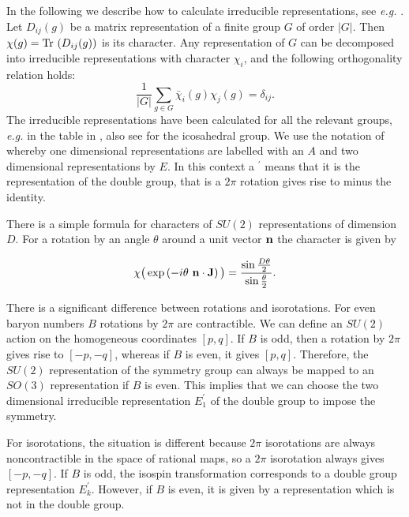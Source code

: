 \documentclass[a4paper,12pt]{article}
\begin{document}
In the following we describe how to calculate irreducible 
representations, see {\it e.g.} \cite{Hamermesh:1962}.
Let $D_{ij}(g)$  be a matrix representation of a finite group $G$ of order 
$|G|$. Then $\chi(g) = {\rm Tr}~ (D_{ij}(g))$ is its character. Any 
representation of $G$ can be decomposed into irreducible representations 
with character $\chi_i$, and the following orthogonality relation holds:
%
\begin{equation}
\frac{1}{|G|} \sum\limits_{g \in G} {\bar \chi}_i(g) \chi_j(g) = \delta_{ij}.
\end{equation}
%
The irreducible representations have been calculated for all the relevant 
groups, {\it e.g.} in the table in \cite{Koster:1963}, also see 
\cite{Dresselhaus:1996} for the icosahedral group. We use the notation 
of \cite{Hamermesh:1962} whereby one dimensional representations are labelled 
with an $A$ and two dimensional representations by $E$. In this context a 
${}^\prime$ means that it is the representation of the double group, that is a 
$2 \pi$ rotation gives rise to minus the identity. 

There is a simple formula for characters of $SU(2)$ representations of 
dimension $D$. For a rotation by an angle $\theta$ around a unit vector 
${\bf n}$ the character is given by

\begin{equation}
\label{character}
\chi\big( \exp \left( -i \theta\ {\bf n} \cdot {\bf J} \right) \big) 
= \frac{\sin \frac{D \theta}{2}}{\sin \frac{\theta}{2}}.
\end{equation}

There is a significant difference between rotations and isorotations. For 
even baryon numbers $B$ rotations by $2 \pi$ are contractible. 
We can define an $SU(2)$ action on the homogeneous coordinates $[p,q]$. 
If $B$ is odd, then a rotation by $2 \pi$ 
gives rise to $[-p,-q]$, whereas if $B$ is even, it gives $[p,q]$. 
Therefore, the $SU(2)$ representation of the symmetry group can 
always be mapped to an $SO(3)$ representation if $B$ is even.
This implies that we can choose the two dimensional 
irreducible representation $E_1^\prime$ of the double group to impose 
the symmetry.

For isorotations, the situation is different because $2 \pi$ isorotations 
are always noncontractible in the space of rational maps, 
so a $2 \pi$ isorotation
always gives $[-p,-q]$. If $B$ is odd, the isospin transformation 
corresponds to a double group representation $E_k^\prime$. 
However, if $B$ is even, it is given by a representation which is not 
in the double group.
\end{document}
